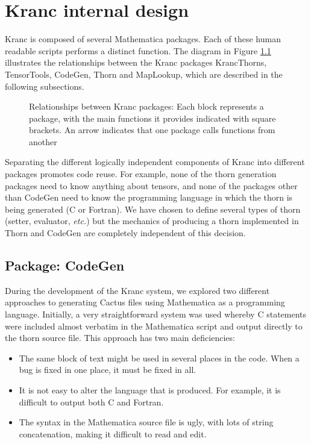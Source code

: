 \documentclass{report}
\begin{document}

\appendix

\chapter{Kranc internal design}

Kranc is composed of several Mathematica packages.  Each of these
human readable scripts performs a distinct function.
The diagram in Figure \ref{fig:kranc_design} illustrates the
relationships between the Kranc packages KrancThorns, TensorTools,
CodeGen, Thorn and MapLookup, which are described in the following
subsections.
\begin{figure}
\centering
\label{fig:kranc_design}
\caption{Relationships between Kranc packages: 
Each block represents a package, with the main functions it provides
indicated with square brackets.  An arrow indicates that one package
calls functions from another}
\end{figure}
Separating the different logically independent components of Kranc
into different packages promotes code reuse.  For example, none of the
thorn generation packages need to know anything about tensors, and
none of the packages other than CodeGen need to know the programming
language in which the thorn is being generated (C or Fortran).  We
have chosen to define several types of thorn (setter, evaluator, {\em
etc.}) but the mechanics of producing a thorn implemented in Thorn and
CodeGen are completely independent of this decision.

\section{Package: CodeGen}

During the development of the Kranc system, we explored two different
approaches to generating Cactus files using Mathematica as a
programming language.  Initially, a very straightforward system was
used whereby C statements were included almost verbatim in the
Mathematica script and output directly to the thorn source file.  This
approach has two main deficiencies:
\begin{itemize}
\item{The same block of text might be used in several places in the
code.  When a bug is fixed in one place, it must be fixed in all.}
\item{It is not easy to alter the language that is produced.  For
example, it is difficult to output both C and Fortran.}
\item{The syntax in the Mathematica source file is ugly, with lots of
string concatenation, making it difficult to read and edit}.
\end{itemize}
\end{document}
